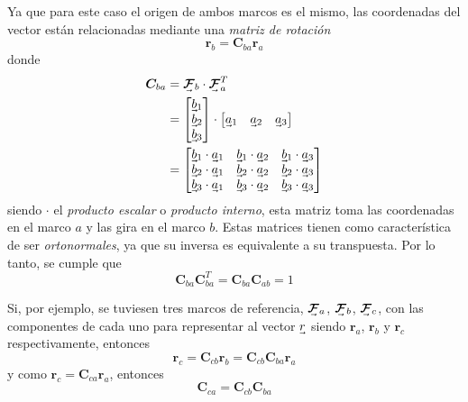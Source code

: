 Ya que para este caso el origen de ambos marcos es el mismo, las coordenadas del vector están relacionadas mediante una \textit{matriz de rotación}
\begin{equation}
    \bm{r}_b = \bm{C}_{ba}\bm{r}_a
\end{equation}
donde
\begin{align}
    \bm{C}_{ba} &= \undervec{\bm{\mathcal{F}}}_b\cdot \undervec{\bm{\mathcal{F}}}_a^T \\
    &=
    \begin{bmatrix}
    \undervec{b}_1 \\
    \undervec{b}_2 \\
    \undervec{b}_3 \\
    \end{bmatrix}
    \cdot
    \begin{bmatrix}
    \undervec{a}_1 & \undervec{a}_2 & \undervec{a}_3
    \end{bmatrix} \\
    &=
    \begin{bmatrix}
    \undervec{b}_1 \cdot \undervec{a}_1 & \undervec{b}_1 \cdot \undervec{a}_2 & \undervec{b}_1 \cdot \undervec{a}_3 \\
    \undervec{b}_2 \cdot \undervec{a}_1 & \undervec{b}_2 \cdot \undervec{a}_2 & \undervec{b}_2 \cdot \undervec{a}_3 \\
    \undervec{b}_3 \cdot \undervec{a}_1 & \undervec{b}_3 \cdot \undervec{a}_2 & \undervec{b}_3 \cdot \undervec{a}_3
    \end{bmatrix}
\end{align}
siendo $\cdot$ el \textit{producto escalar} o \textit{producto interno}, esta matriz toma las coordenadas en el marco $a$ y las gira en el marco $b$. Estas matrices tienen como característica de ser \textit{ortonormales}, ya que su inversa es equivalente a su transpuesta. Por lo tanto, se cumple que
\begin{equation}
    \bm{C}_{ba}\bm{C}_{ba}^T = \bm{C}_{ba}\bm{C}_{ab} = 1
\end{equation}

Si, por ejemplo, se tuviesen tres marcos de referencia, $\undervec{\bm{\mathcal{F}}}_a$, $\undervec{\bm{\mathcal{F}}}_b$, $\undervec{\bm{\mathcal{F}}}_c$, con las componentes de cada uno para representar al vector $\undervec{r}$ siendo $\bm{r}_a$, $\bm{r}_b$ y $\bm{r}_c$ respectivamente, entonces
\begin{equation}
    \bm{r}_c = \bm{C}_{cb}\bm{r}_b = \bm{C}_{cb}\bm{C}_{ba}\bm{r}_a
\end{equation}
y como $\bm{r}_c = \bm{C}_{ca}\bm{r}_a$, entonces
\begin{equation}
    \bm{C}_{ca} = \bm{C}_{cb}\bm{C}_{ba}
\end{equation}{}

